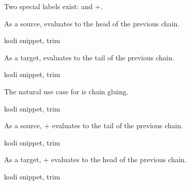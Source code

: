 \begingroup
{}

Two special labels exist: {\ttfamily *} and {\ttfamily +}.

As a source, {\ttfamily *} evaluates to the head of the previous chain.

\begin{tcblisting}{kodi snippet, trim}
\end{tcblisting}

As a target, {\ttfamily *} evaluates to the tail of the previous chain.

\begin{tcblisting}{kodi snippet, trim}
\end{tcblisting}

The natural use case for {\ttfamily *} is chain gluing.

\begin{tcblisting}{kodi snippet, trim}
\end{tcblisting}

As a source, {\ttfamily +} evaluates to the tail of the previous chain.

\begin{tcblisting}{kodi snippet, trim}
\end{tcblisting}

As a target, {\ttfamily +} evaluates to the head of the previous chain.

\begin{tcblisting}{kodi snippet, trim}
\end{tcblisting}

